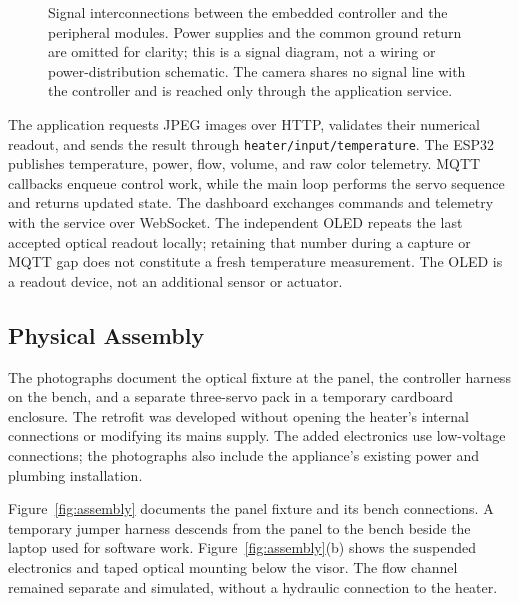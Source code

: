 \begin{figure}[htbp]
\centering

\caption{Signal interconnections between the embedded controller and the peripheral modules. Power supplies and the common ground return are omitted for clarity; this is a signal diagram, not a wiring or power-distribution schematic. The camera shares no signal line with the controller and is reached only through the application service.}
\label{fig:interconnections}
\end{figure}

The application requests JPEG images over HTTP, validates their numerical readout, and sends the result through \texttt{heater/input/temperature}. The ESP32 publishes temperature, power, flow, volume, and raw color telemetry. MQTT callbacks enqueue control work, while the main loop performs the servo sequence and returns updated state. The dashboard exchanges commands and telemetry with the service over WebSocket. The independent OLED repeats the last accepted optical readout locally; retaining that number during a capture or MQTT gap does not constitute a fresh temperature measurement. The OLED is a readout device, not an additional sensor or actuator.

\subsection{Physical Assembly}
The photographs document the optical fixture at the panel, the controller harness on the bench, and a separate three-servo pack in a temporary cardboard enclosure. The retrofit was developed without opening the heater's internal connections or modifying its mains supply. The added electronics use low-voltage connections; the photographs also include the appliance's existing power and plumbing installation.

Figure~\ref{fig:assembly} documents the panel fixture and its bench connections. A temporary jumper harness descends from the panel to the bench beside the laptop used for software work. Figure~\ref{fig:assembly}(b) shows the suspended electronics and taped optical mounting below the visor. The flow channel remained separate and simulated, without a hydraulic connection to the heater.


